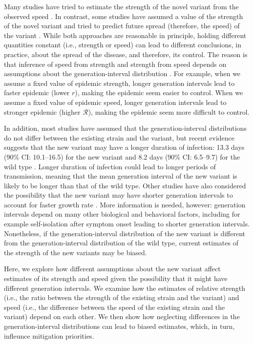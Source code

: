 \documentclass[12pt]{article}
\newcommand{\RR}{\ensuremath{{\mathcal R}}\xspace}
\begin{document}
Many studies have tried to estimate the strength of the novel variant from the observed speed \citep{davies2021estimated, leung2021early, volz2021transmission,zhao2021}.
In contrast, some studies have assumed a value of the strength of the novel variant and tried to predict future spread (therefore, the speed) of the variant \citep{davies2021estimated}.
While both approaches are reasonable in principle, holding different quantities constant (i.e., strength or speed) can lead to different conclusions, in practice, about the spread of the disease, and therefore, its control.
The reason is that inference of speed from strength and strength from speed depends on assumptions about the generation-interval distribution \citep{roberts2007model,svensson2007note,wallinga2007generation,dushoff2020speed}.
For example, when we assume a fixed value of epidemic strength, longer generation intervals lead to faster epidemic (lower $r$), making the epidemic seem easier to control.
When we assume a fixed value of epidemic speed, longer generation intervals lead to stronger epidemic (higher $\RR$), making the epidemic seem more difficult to control.

In addition, most studies have assumed that the generation-interval distributions do not differ between the existing strain and the variant, but recent evidence suggests that the new variant may have a longer duration of infection: 13.3 days (90\% CI: 10.1--16.5) for the new variant and 8.2 days (90\% CI: 6.5--9.7) for the wild type \citep{kissler2021densely}.
Longer duration of infection could lead to longer periods of transmission, meaning that the mean generation interval of the new variant is likely to be longer than that of the wild type.
Other studies have also considered the possibility that the new variant may have shorter generation intervals to account for faster growth rate \citep{davies2021estimated}.
More information is needed, however: generation intervals depend on many other biological and behavioral factors, including for example self-isolation after symptom onset leading to shorter generation intervals.
Nonetheless, if the generation-interval distribution of the new variant is different from the generation-interval distribution of the wild type, current estimates of the strength of the new variants may be biased.

Here, we explore how different assumptions about the new variant affect estimates of its strength and speed given the possibility that it might have different generation intervals.
We examine how the estimates of relative strength (i.e., the ratio between the strength of the existing strain and the variant) and speed (i.e., the difference between the speed of the existing strain and the variant) depend on each other.
We then show how neglecting differences in the generation-interval distributions can lead to biased estimates, which, in turn, infleunce mitigation priorities.
\end{document}
